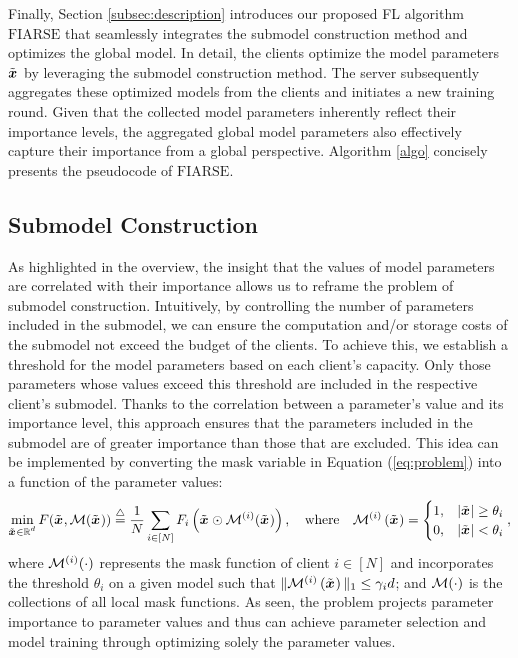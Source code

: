 \documentclass{article}
\theoremstyle{plain}
\theoremstyle{definition}
\theoremstyle{remark}
\newcommand{\algo}{\ensuremath{\text{FIARSE}}\xspace}
\renewcommand{\eqref}[1]{Equation (\ref{#1})}
\newcommand{\defeq}{\overset{\triangle}{=}}
\newcommand{\bracket}[1]{\left(#1\right)}
\begin{document}
Finally, Section \ref{subsec:description} introduces our proposed FL algorithm \algo that seamlessly integrates the submodel construction method and optimizes the global model. In detail, the clients optimize the model parameters $\x{}$ by leveraging the submodel construction method. The server subsequently aggregates these optimized models from the clients and initiates a new training round. Given that the collected model parameters inherently reflect their importance levels, the aggregated global model parameters also effectively capture their importance from a global perspective.  Algorithm \ref{algo} concisely presents the pseudocode of \algo. 

\subsection{Submodel Construction} \label{subsec:mask_optim}

As highlighted in the overview, the insight that the values of model parameters are correlated with their importance allows us to reframe the problem of submodel construction. Intuitively, by controlling the number of parameters included in the submodel, we can ensure the computation and/or storage costs of the submodel not exceed the budget of the clients. To achieve this, we establish a threshold for the model parameters based on each client's capacity. Only those parameters whose values exceed this threshold are included in the respective client's submodel. 
Thanks to the correlation between a parameter's value and its importance level, this approach ensures that the parameters included in the submodel are of greater importance than those that are excluded. This idea can be implemented by converting the mask variable in \eqref{eq:problem} into a function of the parameter values:
\begin{equation} \label{eq:fp}
    \min_{\substack{\x{} \in \mathbb{R}^d}} F(\x{}, \mask(\x{})) \defeq \frac{1}{N} \sum_{i \in [N]} F_i \bracket{\x{} \odot \mask{i}(\x{})}, \quad \text{where} \quad \mask{i}\bracket{\x{}} = \begin{cases}
        1, & |\x{}| \geq \theta_i \\
        0, & |\x{}| < \theta_i
    \end{cases}, 
\end{equation}
where $\mask{i}(\cdot)$ represents the mask function of client $i \in [N]$ and incorporates the threshold $\theta_i$ on a given model such that $\|\mask{i}\bracket{\x{}}\|_1 \leq \gamma_i d$; and $\mask(\cdot)$ is the collections of all local mask functions. 
As seen, the problem projects parameter importance to parameter values and thus can achieve parameter selection and model training through optimizing solely the parameter values.
\end{document}
